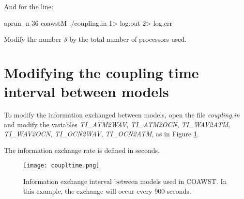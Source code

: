 \noindent And for the line:
\bigskip

\begin{bashcode}
aprun -n 36 coawstM ./coupling.in 1> log.out 2> log.err
\end{bashcode}
\bigskip

\noindent Modify the number \textit{3} by the total number of processors used.
\bigskip

\section{Modifying the coupling time interval between models}
\bigskip

\noindent To modify the information exchanged between models, open the file \textit{coupling.in} and
modify the variables \textit{TI\_ATM2WAV}, \textit{TI\_ATM2OCN}, \textit{TI\_WAV2ATM}, \textit{TI\_WAV2OCN}, \textit{TI\_OCN2WAV},
          \textit{TI\_OCN2ATM}, as in Figure \textcolor{bleu_cite}{\ref{taxaacopla}}.
\bigskip

\begin{tcolorbox}[enhanced,
  grow to left by=0cm,%
  grow to right by=0cm,%
  enlarge top by=0cm,%
  enlarge bottom by=0cm,%
  tcbox raise base,
  boxrule=1.0pt,
  left=18mm,
  colframe=red!50!black,coltext=red!25!black,colback=red!10!white,
  overlay={\begin{tcbclipinterior}\fill[red!75!blue!50!white] (frame.south west)
    rectangle node[text=white,font=\sffamily\bfseries\footnotesize,rotate=0] {WARNING} ([xshift=18mm]frame.north west);\end{tcbclipinterior}}]
    The information exchange rate is defined in seconds.
\end{tcolorbox}
\bigskip

\begin{figure}[H]
    \centering
    \texttt{[image: coupltime.png]}
    \caption{Information exchange interval between models used in COAWST. In this example, the exchange will occur every 900 seconds.}
    \label{taxaacopla}
\end{figure}
\bigskip
